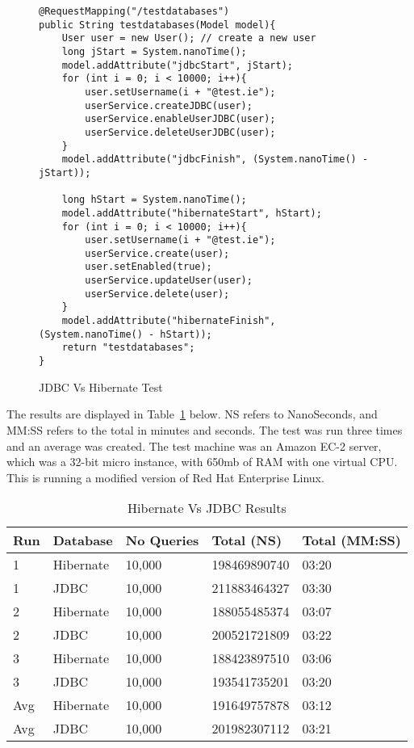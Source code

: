 \begin{figure}[H]
\begin{lstlisting}
@RequestMapping("/testdatabases")
public String testdatabases(Model model){
	User user = new User(); // create a new user
	long jStart = System.nanoTime();
	model.addAttribute("jdbcStart", jStart);
	for (int i = 0; i < 10000; i++){
		user.setUsername(i + "@test.ie");
		userService.createJDBC(user);
		userService.enableUserJDBC(user);
		userService.deleteUserJDBC(user);
	}
	model.addAttribute("jdbcFinish", (System.nanoTime() - jStart));
	
	long hStart = System.nanoTime();
	model.addAttribute("hibernateStart", hStart);
	for (int i = 0; i < 10000; i++){
		user.setUsername(i + "@test.ie");
		userService.create(user);
		user.setEnabled(true);
		userService.updateUser(user);
		userService.delete(user);
	}
	model.addAttribute("hibernateFinish", (System.nanoTime() - hStart));
	return "testdatabases";
}
\end{lstlisting}
\caption{JDBC Vs Hibernate Test}
\label{fig:jdbcvhibernate}
\end{figure}

The results are displayed in Table~\ref{fig:resulttable} below. NS refers to NanoSeconds, and MM:SS refers to the total in minutes and seconds. The test was run three times and an average was created. The test machine was an Amazon EC-2 server, which was a 32-bit micro instance, with 650mb of RAM with one virtual CPU. This is running a modified version of Red Hat Enterprise Linux.

\begin{table}[H]
\caption{Hibernate Vs JDBC Results}
\begin{center}
    \begin{tabular}{ |l | l | l | l | p{2.5cm} |}
    \hline
     Run & Database & No Queries & Total (NS) & Total (MM:SS)\\ \hline
	 1 & Hibernate & 10,000 &198469890740&03:20\\ \hline
	 1 & JDBC & 10,000 &211883464327&03:30\\ \hline
	 2 & Hibernate & 10,000 &188055485374&03:07\\ \hline
	 2 & JDBC & 10,000 &200521721809&03:22\\ \hline
	 3 & Hibernate & 10,000 &188423897510&03:06\\ \hline
	 3 & JDBC & 10,000 &193541735201&03:20\\ \hline
	Avg & Hibernate & 10,000 &191649757878 &03:12\\ \hline
	Avg & JDBC & 10,000 & 201982307112&03:21\\ \hline
    \end{tabular}
\end{center}
\label{fig:resulttable}
\end{table}



